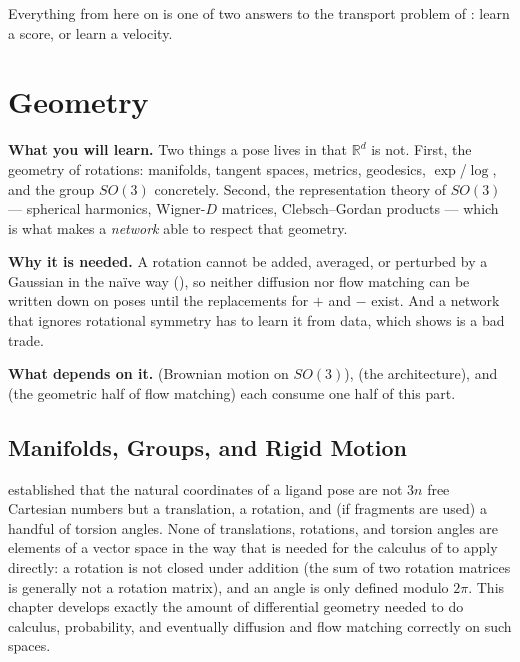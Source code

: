 \documentclass[11pt,a4paper]{report}
\theoremstyle{definition}
\theoremstyle{remark}
\newcommand{\RR}{\mathbb R}
\begin{document}
Everything from here on is one of two answers to the transport problem of : learn a score, or learn a velocity.

\clearpage

\part{Geometry}
\label{part:geometry}


\begin{tcolorbox}[colback=gray!4,colframe=gray!55!black,
  title=Part II at a glance, fonttitle=\bfseries, breakable]
\textbf{What you will learn.} Two things a pose lives in that $\RR^d$ is not. First, the geometry of rotations: manifolds, tangent spaces, metrics, geodesics, $\exp$/$\log$, and the group $SO(3)$ concretely. Second, the representation theory of $SO(3)$ --- spherical harmonics, Wigner-$D$ matrices, Clebsch--Gordan products --- which is what makes a \emph{network} able to respect that geometry.

\textbf{Why it is needed.} A rotation cannot be added, averaged, or perturbed by a Gaussian in the na\"ive way (), so neither diffusion nor flow matching can be written down on poses until the replacements for $+$ and $-$ exist. And a network that ignores rotational symmetry has to learn it from data, which  shows is a bad trade.

\textbf{What depends on it.}  (Brownian motion on $SO(3)$),  (the architecture), and  (the geometric half of flow matching) each consume one half of this part.
\end{tcolorbox}


\chapter{Manifolds, Groups, and Rigid Motion}
\label{chap:groups}

 established that the natural coordinates of a ligand
pose are not $3n$ free Cartesian numbers but a translation, a rotation, and
(if fragments are used) a handful of torsion angles. None of translations,
rotations, and torsion angles are elements of a vector space in the way
that is needed for the calculus of  to apply
directly: a rotation is not closed under addition (the sum of two rotation
matrices is generally not a rotation matrix), and an angle is only defined
modulo $2\pi$. This chapter develops exactly the amount of differential
geometry needed to do calculus, probability, and eventually diffusion and
flow matching correctly on such spaces.
\end{document}
